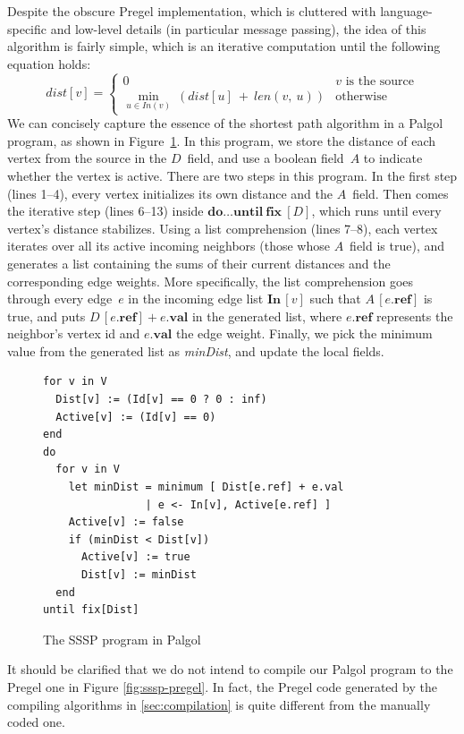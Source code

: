 \documentclass{sokendai_thesis} %
\begin{document}
Despite the obscure Pregel implementation, which is cluttered with language-specific and low-level details (in particular message passing), the idea of this algorithm is fairly simple, which is an iterative computation until the following equation holds:
$$ \mathit{dist}[v] =\begin{cases}0 & \text{$v$~is the source} \\ \min_{u\in \mathit{In}(v)}~(\mathit{dist}[u]~+~\mathit{len}(v,~u)) & \text{otherwise} \end{cases} $$
We can concisely capture the essence of the shortest path algorithm in a Palgol program, as shown in Figure~\ref{fig:sssp-palgol}.
In this program, we store the distance of each vertex from the source in the $D$~field, and use a boolean field~$A$ to indicate whether the vertex is active.
There are two steps in this program.
In the first step (lines 1--4), every vertex initializes its own distance and the $A$~field.
Then comes the iterative step (lines 6--13) inside $\mathbf{do} \ldots \mathbf{until}~\mathbf{fix}~[D]$, which runs until every vertex's distance stabilizes.
Using a list comprehension (lines 7--8), each vertex iterates over all its active incoming neighbors (those whose $A$~field is true), and generates a list containing the sums of their current distances and the corresponding edge weights.
More specifically, the list comprehension goes through every edge~$e$ in the incoming edge list $\mathbf{In}\,[v]$ such that $A\,[e.\mathbf{ref}]$ is true, and puts $D\,[e.\mathbf{ref}] + e.\mathbf{val}$ in the generated list, where $e.\mathbf{ref}$ represents the neighbor's vertex id and $e.\mathbf{val}$ the edge weight.
Finally, we pick the minimum value from the generated list as \textit{minDist}, and update the local fields.

\begin{figure}[thp]
\begin{lstlisting}[basicstyle=\small\ttfamily,xleftmargin=0.1\textwidth]
for v in V
  Dist[v] := (Id[v] == 0 ? 0 : inf)
  Active[v] := (Id[v] == 0)
end
do
  for v in V
    let minDist = minimum [ Dist[e.ref] + e.val
                | e <- In[v], Active[e.ref] ]
    Active[v] := false
    if (minDist < Dist[v])
      Active[v] := true
      Dist[v] := minDist
  end
until fix[Dist]
\end{lstlisting}
\vspace{-2ex}
\caption{The SSSP program in Palgol}
\label{fig:sssp-palgol}
\end{figure}


It should be clarified that we do not intend to compile our Palgol program to the Pregel one in Figure \ref{fig:sssp-pregel}.
In fact, the Pregel code generated by the compiling algorithms in \autoref{sec:compilation} is quite different from the manually coded one.
\end{document}
